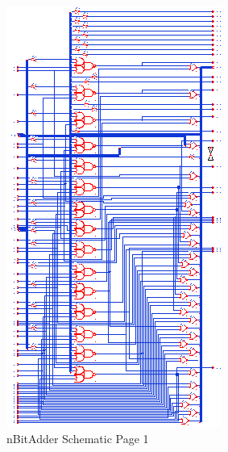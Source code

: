 \documentclass[11pt]{article}
\begin{document}
		\begin{figure}[H] 
			\centering 
			\includegraphics[width=\textwidth,height=\dimexpr\textheight-4\baselineskip-\abovecaptionskip-\belowcaptionskip\relax,keepaspectratio]{"Pictures/nBitAdder Schematic Page 1"}
			\caption{nBitAdder Schematic Page 1} 
			\label{fig:nBitAdder-Schematic-Page-1} 
		\end{figure}
		
\end{document}
